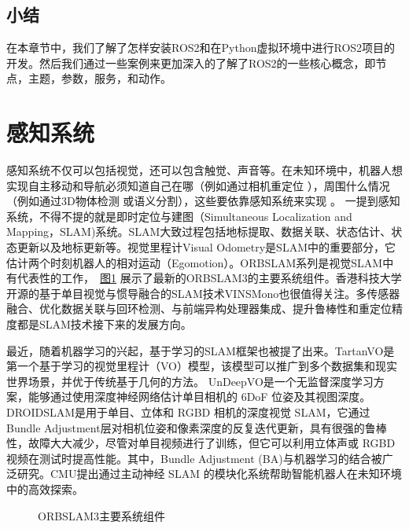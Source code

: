 \documentclass[letterpaper,10pt,english]{sphinxmanual}
\let\sphinxpxdimen\pdfpxdimen\else\newdimen\sphinxpxdimen
\begin{document}
\subsection{小结}
\label{\detokenize{chapter_rl_sys/ros_code_ex:id20}}
\sphinxAtStartPar
在本章节中，我们了解了怎样安装ROS2和在Python虚拟环境中进行ROS2项目的开发。然后我们通过一些案例来更加深入的了解了ROS2的一些核心概念，即节点，主题，参数，服务，和动作。


\section{感知系统}
\label{\detokenize{chapter_rl_sys/perception:id1}}\label{\detokenize{chapter_rl_sys/perception::doc}}
\sphinxAtStartPar
感知系统不仅可以包括视觉，还可以包含触觉、声音等。在未知环境中，机器人想实现自主移动和导航必须知道自己在哪（例如通过相机重定位
），周围什么情况（例如通过3D物体检测
或语义分割），这些要依靠感知系统来实现
。
一提到感知系统，不得不提的就是即时定位与建图（Simultaneous Localization
and
Mapping，SLAM)系统。SLAM大致过程包括地标提取、数据关联、状态估计、状态更新以及地标更新等。视觉里程计Visual
Odometry是SLAM中的重要部分，它估计两个时刻机器人的相对运动（Ego\sphinxhyphen{}motion）。ORB\sphinxhyphen{}SLAM系列是视觉SLAM中有代表性的工作， \hyperref[\detokenize{chapter_rl_sys/perception:orbslam3}]{图\ref{\detokenize{chapter_rl_sys/perception:orbslam3}}}
展示了最新的ORB\sphinxhyphen{}SLAM3的主要系统组件。香港科技大学开源的基于单目视觉与惯导融合的SLAM技术VINS\sphinxhyphen{}Mono也很值得关注。多传感器融合、优化数据关联与回环检测、与前端异构处理器集成、提升鲁棒性和重定位精度都是SLAM技术接下来的发展方向。

\sphinxAtStartPar
最近，随着机器学习的兴起，基于学习的SLAM框架也被提了出来。TartanVO是第一个基于学习的视觉里程计（VO）模型，该模型可以推广到多个数据集和现实世界场景，并优于传统基于几何的方法。
UnDeepVO是一个无监督深度学习方案，能够通过使用深度神经网络估计单目相机的
6\sphinxhyphen{}DoF 位姿及其视图深度。DROID\sphinxhyphen{}SLAM是用于单目、立体和 RGB\sphinxhyphen{}D
相机的深度视觉 SLAM，它通过Bundle
Adjustment层对相机位姿和像素深度的反复迭代更新，具有很强的鲁棒性，故障大大减少，尽管对单目视频进行了训练，但它可以利用立体声或
RGB\sphinxhyphen{}D 视频在测试时提高性能。其中，Bundle Adjustment
(BA)与机器学习的结合被广泛研究。CMU提出通过主动神经 SLAM
的模块化系统帮助智能机器人在未知环境中的高效探索。

\begin{figure}[H]
\centering
\capstart

\noindent\sphinxincludegraphics[width=800\sphinxpxdimen]{{orbslam3}.png}
\caption{ORB\sphinxhyphen{}SLAM3主要系统组件 }\label{\detokenize{chapter_rl_sys/perception:id6}}\label{\detokenize{chapter_rl_sys/perception:orbslam3}}\end{figure}
\end{document}
